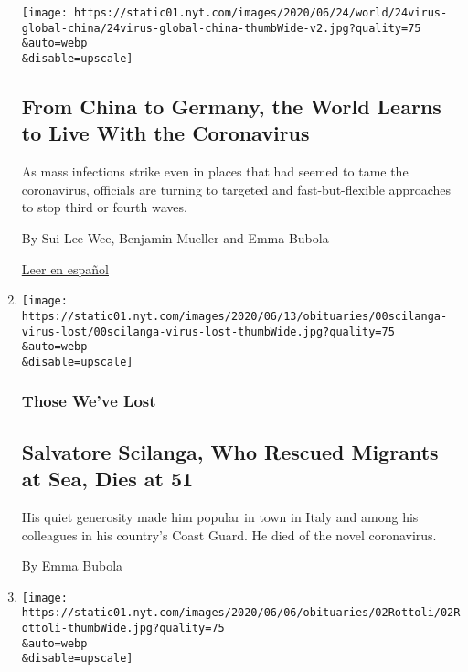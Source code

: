 \begin{enumerate}
  \texttt{[image: https://static01.nyt.com/images/2020/06/24/world/24virus-global-china/24virus-global-china-thumbWide-v2.jpg?quality=75\\\&auto=webp\\\&disable=upscale]}

  \hypertarget{from-china-to-germany-the-world-learns-to-live-with-the-coronavirus}{%
  \subsection{From China to Germany, the World Learns to Live With the
  Coronavirus}\label{from-china-to-germany-the-world-learns-to-live-with-the-coronavirus}}

  As mass infections strike even in places that had seemed to tame the
  coronavirus, officials are turning to targeted and fast-but-flexible
  approaches to stop third or fourth waves.

  By Sui-Lee Wee, Benjamin Mueller and Emma Bubola

  \href{https://www.nytimes.com/es/2020/06/26/espanol/mundo/controlar-coronavirus-paises.html}{Leer
  en español}
\item
  \href{/2020/06/11/obituaries/salvatore-scilanga-dead-coronavirus.html}{}

  \texttt{[image: https://static01.nyt.com/images/2020/06/13/obituaries/00scilanga-virus-lost/00scilanga-virus-lost-thumbWide.jpg?quality=75\\\&auto=webp\\\&disable=upscale]}

  \hypertarget{those-weve-lost}{%
  \subsubsection{Those We've Lost}\label{those-weve-lost}}

  \hypertarget{salvatore-scilanga-who-rescued-migrants-at-sea-dies-at-51}{%
  \subsection{Salvatore Scilanga, Who Rescued Migrants at Sea, Dies at
  51}\label{salvatore-scilanga-who-rescued-migrants-at-sea-dies-at-51}}

  His quiet generosity made him popular in town in Italy and among his
  colleagues in his country's Coast Guard. He died of the novel
  coronavirus.

  By Emma Bubola
\item
  \href{/2020/06/03/obituaries/angelo-rottoli-dead-coronavirus.html}{}

  \texttt{[image: https://static01.nyt.com/images/2020/06/06/obituaries/02Rottoli/02Rottoli-thumbWide.jpg?quality=75\\\&auto=webp\\\&disable=upscale]}


\end{enumerate}
